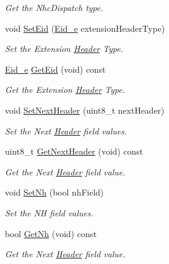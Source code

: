 \begin{DoxyCompactItemize}
\begin{DoxyCompactList}\small\item\em Get the Nhc\+Dispatch type. \end{DoxyCompactList}\item 
void \hyperlink{classns3_1_1SixLowPanNhcExtension_a887f5097f7295afba7154991a6864c37}{Set\+Eid} (\hyperlink{classns3_1_1SixLowPanNhcExtension_ac692a22abe80c30bcbafa57ef36bf5ad}{Eid\+\_\+e} extension\+Header\+Type)
\begin{DoxyCompactList}\small\item\em Set the Extension \hyperlink{classns3_1_1Header}{Header} Type. \end{DoxyCompactList}\item 
\hyperlink{classns3_1_1SixLowPanNhcExtension_ac692a22abe80c30bcbafa57ef36bf5ad}{Eid\+\_\+e} \hyperlink{classns3_1_1SixLowPanNhcExtension_aacc199347ba063995f8f5eb83f8fea84}{Get\+Eid} (void) const 
\begin{DoxyCompactList}\small\item\em Get the Extension \hyperlink{classns3_1_1Header}{Header} Type. \end{DoxyCompactList}\item 
void \hyperlink{classns3_1_1SixLowPanNhcExtension_ae7dbfb5952b95c5e16d751354aa8c1c4}{Set\+Next\+Header} (uint8\+\_\+t next\+Header)
\begin{DoxyCompactList}\small\item\em Set the Next \hyperlink{classns3_1_1Header}{Header} field values. \end{DoxyCompactList}\item 
uint8\+\_\+t \hyperlink{classns3_1_1SixLowPanNhcExtension_a15e2f9050b7929ab90968328571742ae}{Get\+Next\+Header} (void) const 
\begin{DoxyCompactList}\small\item\em Get the Next \hyperlink{classns3_1_1Header}{Header} field value. \end{DoxyCompactList}\item 
void \hyperlink{classns3_1_1SixLowPanNhcExtension_a7c261811b9ae48647c20a0ed8ee71e20}{Set\+Nh} (bool nh\+Field)
\begin{DoxyCompactList}\small\item\em Set the NH field values. \end{DoxyCompactList}\item 
bool \hyperlink{classns3_1_1SixLowPanNhcExtension_a67e61ea92bbe10795772d320874bc632}{Get\+Nh} (void) const 
\begin{DoxyCompactList}\small\item\em Get the Next \hyperlink{classns3_1_1Header}{Header} field value. \end{DoxyCompactList}\item 

\end{DoxyCompactItemize}
